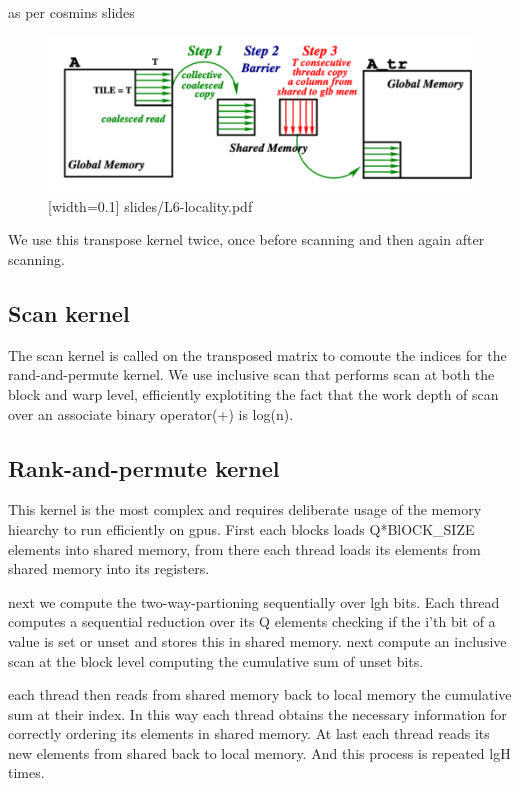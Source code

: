 \documentclass{article}
\begin{document}
as per cosmins slides
\begin{figure}
  \includegraphics{images/coalesced_transpose.png}[width=0.1]
  slides/L6-locality.pdf
\end{figure}


We use this transpose kernel twice, once before scanning and then again after scanning.

\subsection{Scan kernel}
The scan kernel is called on the transposed matrix to comoute the indices for the rand-and-permute kernel. 
We use inclusive scan that performs scan at both the block and warp level, efficiently explotiting the fact that the work depth of scan over an associate binary operator(+) is log(n).

\subsection{Rank-and-permute kernel}

This kernel is the most complex and requires deliberate usage of the memory hiearchy to run efficiently on gpus.
First each blocks loads Q*BlOCK\_SIZE elements into shared memory, from there each thread loads its elements from shared memory into its registers.

next we compute the two-way-partioning sequentially over lgh bits. 
Each thread computes a sequential reduction over its Q elements checking if the i'th bit of a value is set or unset and stores this in shared memory. 
next compute an inclusive scan at the block level computing the cumulative sum of unset bits. 

each thread then reads from shared memory back to local memory the cumulative sum at their index. 
In this way each thread obtains the necessary information for correctly ordering its elements in shared memory. 
At last each thread reads its new elements from shared back to local memory. And this process is repeated lgH times.
\end{document}

